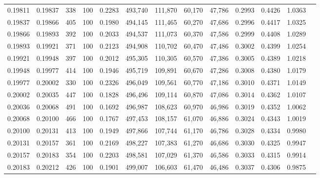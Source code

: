 \begin{tabular}{rrrrrrrrrrrrr}
0.19811 & 0.19837 &   338 & 100 &                                     0.2283 & 493,740 & 111,870 &  60,170 &  47,786 & 0.2993 & 0.4426 & 1.0363 \\
0.19837 & 0.19866 &   405 & 100 &                                     0.1980 & 494,145 & 111,465 &  60,270 &  47,686 & 0.2996 & 0.4417 & 1.0325 \\
0.19866 & 0.19893 &   392 & 100 &                                     0.2033 & 494,537 & 111,073 &  60,370 &  47,586 & 0.2999 & 0.4408 & 1.0289 \\
0.19893 & 0.19921 &   371 & 100 &                                     0.2123 & 494,908 & 110,702 &  60,470 &  47,486 & 0.3002 & 0.4399 & 1.0254 \\
0.19921 & 0.19948 &   397 & 100 &                                     0.2012 & 495,305 & 110,305 &  60,570 &  47,386 & 0.3005 & 0.4389 & 1.0218 \\
0.19948 & 0.19977 &   414 & 100 &                                     0.1946 & 495,719 & 109,891 &  60,670 &  47,286 & 0.3008 & 0.4380 & 1.0179 \\
0.19977 & 0.20002 &   330 & 100 &                                     0.2326 & 496,049 & 109,561 &  60,770 &  47,186 & 0.3010 & 0.4371 & 1.0149 \\
0.20002 & 0.20035 &   447 & 100 &                                     0.1828 & 496,496 & 109,114 &  60,870 &  47,086 & 0.3014 & 0.4362 & 1.0107 \\
0.20036 & 0.20068 &   491 & 100 &                                     0.1692 & 496,987 & 108,623 &  60,970 &  46,986 & 0.3019 & 0.4352 & 1.0062 \\
0.20068 & 0.20100 &   466 & 100 &                                     0.1767 & 497,453 & 108,157 &  61,070 &  46,886 & 0.3024 & 0.4343 & 1.0019 \\
0.20100 & 0.20131 &   413 & 100 &                                     0.1949 & 497,866 & 107,744 &  61,170 &  46,786 & 0.3028 & 0.4334 & 0.9980 \\
0.20131 & 0.20157 &   361 & 100 &                                     0.2169 & 498,227 & 107,383 &  61,270 &  46,686 & 0.3030 & 0.4325 & 0.9947 \\
0.20157 & 0.20183 &   354 & 100 &                                     0.2203 & 498,581 & 107,029 &  61,370 &  46,586 & 0.3033 & 0.4315 & 0.9914 \\
0.20183 & 0.20212 &   426 & 100 &                                     0.1901 & 499,007 & 106,603 &  61,470 &  46,486 & 0.3037 & 0.4306 & 0.9875 \\

\end{tabular}
